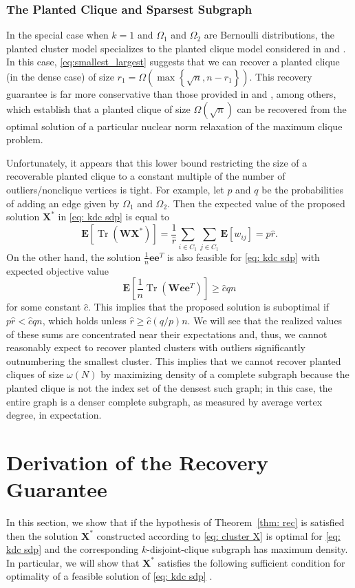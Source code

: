 \documentclass[twoside,11pt]{article}
\newcommand{\E}{\mathbf{E}}
\DeclareMathOperator{\tr}{{Tr}}
\newcommand{\e}{\bs {e}}
\newcommand{\bs}{\boldsymbol}
\newcommand{\X}{\bs {X}}
\newcommand{\W}{\bs {W}}
\newcommand{\0}{\bs{0}}
\newcommand{\sbra}[1] {\ensuremath{ \left[ #1\right]}} %
\newcommand{\rbra}[1]{\ensuremath{\left( #1 \right)}} %
\newcommand{\bra}[1]{\ensuremath{\left\{ #1 \right\}}} %
\newcommand{\kdc}{\(k\)-disjoint-clique }
\begin{document}
{\subsubsection{The Planted Clique and Sparsest Subgraph}

In the special case when $k=1$ and $\Omega_1$ and $\Omega_2$
are Bernoulli distributions, the planted cluster model
specializes to the planted clique model considered in
\cite{ames2011nuclear} and \cite{ames2015guaranteed}.
In this case, \eqref{eq:smallest_largest}
suggests that we can recover a planted clique (in the dense
case) of size $r_1 = \Omega \rbra{ \max \bra{\sqrt{n}, n - r_1 } }$.
This recovery guarantee is far more conservative than those
provided in \cite{ames2011nuclear} and \cite{ames2015guaranteed},
among others,
which establish that a planted clique
of size $\Omega(\sqrt n)$ can be recovered from the optimal solution
of a particular nuclear norm relaxation of the maximum clique problem.

Unfortunately, it appears that this lower bound restricting the size
of a recoverable planted clique
to a constant multiple of the number of outliers/nonclique vertices
is tight.
For example, let $p$ and $q$ be the probabilities of adding an edge
given by $\Omega_1$ and $\Omega_2$.
Then the expected value of the proposed solution $\X^*$
in \eqref{eq: kdc sdp}
is equal to
$$
	\E [ \tr(\W \X^*)] = \frac{1}{\hat r} \sum_{i \in C_1} \sum_{j \in C_1}
		\E[w_{ij} ] = p \hat r.
$$
On the other hand, the solution $\frac{1}{n} \e\e^T$ is also
feasible for \eqref{eq: kdc sdp} with expected objective value
$$
	\E \sbra{ \frac{1}{n} \tr(\W \e\e^T) }
	 \ge \hat c q n
$$
for some constant $\hat c$.
This implies that the proposed solution is suboptimal if
$p \hat r < \hat c q n$, which holds unless $\hat r \ge \hat c (q/p) n$.
We will see that the realized values of these sums
are concentrated near their expectations and, thus, we cannot
reasonably expect to recover planted clusters with outliers significantly
outnumbering the smallest cluster. This implies that we cannot
recover planted cliques of size $\omega(N)$ by maximizing
density of a complete subgraph because the planted clique
is not the index set of the densest such graph; in this case, the
entire graph is a denser
complete subgraph, as measured by average vertex degree,
in expectation.

\section{Derivation of the Recovery Guarantee}
\label{sec: proof}
In this section, we show that if the hypothesis of Theorem~\ref{thm: rec} is satisfied
then the solution \(\X^*\) constructed according to \eqref{eq: cluster X}
is optimal for \eqref{eq: kdc sdp} and the corresponding \kdc subgraph has maximum density.
In particular, we will show that \(\X^*\) satisfies
the following sufficient condition for optimality of a feasible solution of \eqref{eq: kdc sdp}
\citep[see][Theorem 4.1]{ames2014guaranteed}.


}
\end{document}
